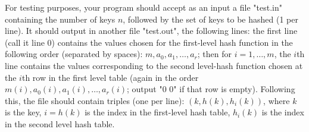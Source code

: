 \documentclass{article}
\begin{document}
For testing purposes, your program  should accept as an input a file "test.in" containing the number of keys $n$, followed by the set of keys to be hashed (1 per line). It should output in another file "test.out", the following lines: the first line (call it line 0) contains the values chosen for the first-level hash function in the following order (separated by spaces): $m, a_0,a_1,\ldots,a_r$; then for $i=1,\ldots,m$, the $i$th line contains the values corresponding to the second level-hash function chosen at the $i$th row in the first level table (again in the order $m(i), a_0(i),a_1(i),\ldots,a_r(i)$; output "0 0" if that row is empty). Following this, the file should contain triples (one per line): $(k,h(k),h_i(k))$, where $k$ is the key, $i=h(k)$ is the index in the first-level hash table, $h_i(k)$ is the index in the second level hash table.
\end{document}
